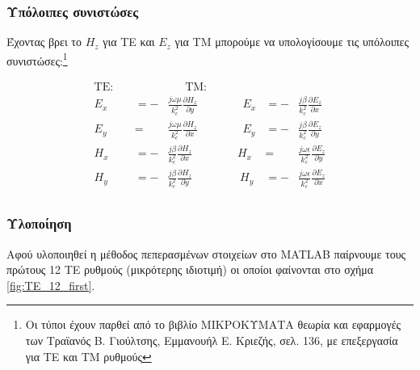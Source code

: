 \documentclass[10pt, letterpaper]{article}
\newcommand{\en}{\selectlanguage{english}}
\newcommand{\gr}{\selectlanguage{greek}}
\begin{document}
\subsubsection*{Υπόλοιπες συνιστώσες}

Έχοντας βρει το $H_z$ για ΤΕ και $E_z$ για ΤΜ μπορούμε να υπολογίσουμε τις υπόλοιπες συνιστώσες:\footnote{Οι τύποι έχουν παρθεί από
το βιβλίο ΜΙΚΡΟΚΥΜΑΤΑ θεωρία και εφαρμογές των Τραϊανός Β. Γιούλτσης, Εμμανουήλ Ε. Κριεζής, σελ. 136, με επεξεργασία για ΤΕ και ΤΜ ρυθμούς}


\begin{equation} \label{eq:rest_coords}
  \begin{aligned}
    \text{TE}: \ \ \ \ \ & &     \ \ \ \ \ \ \  \text{TM}: \ \ \ \ \ & & \\ 
    E_x &= - &\frac{j \omega \mu}{k_c^2} \frac{\partial H_z}{\partial y} \ \ \ \ \ \ \ \ \ \ \ \ \ \ \ \ \ \         E_x &= - &\frac{j \beta}{k_c^2} \frac{\partial E_z}{\partial x}  \\ 
    E_y &=  &\frac{j \omega \mu}{k_c^2} \frac{\partial H_z}{\partial x} \ \ \ \ \ \ \ \ \ \ \ \ \ \ \ \  \  \        E_y &= - &\frac{j \beta}{k_c^2} \frac{\partial E_z}{\partial y}  \\ 
    H_x &= - &\frac{j \beta}{k_c^2} \frac{\partial H_z}{\partial x}  \ \ \ \ \ \ \ \ \ \ \ \ \ \ \ \ \ \         H_x &=   &\frac{j \omega \epsilon }{k_c^2} \frac{\partial E_z}{\partial y} \\ 
    H_y &= - &\frac{j \beta}{k_c^2} \frac{\partial H_z}{\partial y}   \ \ \ \ \ \ \ \ \ \ \ \ \ \ \ \ \ \ \     H_y &= - &\frac{j \omega \epsilon }{k_c^2} \frac{\partial E_z}{\partial x}  \\ 
  \end{aligned}
\end{equation}




\subsubsection*{Υλοποίηση}

Αφού υλοποιηθεί η μέθοδος πεπερασμένων στοιχείων στο \en MATLAB \gr παίρνουμε τους πρώτους 12 ΤΕ ρυθμούς (μικρότερης ιδιοτιμή)
οι οποίοι φαίνονται στο σχήμα \ref{fig:TE_12_first}. 
\end{document}
